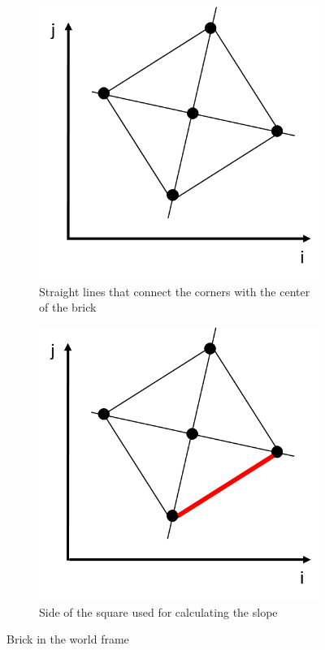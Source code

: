 \begin{figure}[h]
 
\begin{subfigure}{0.5\textwidth}
\captionsetup{justification=centering}
\includegraphics[scale=0.5]{figures/diag_square.png} 
\centering
\caption{Straight lines that connect the corners with the center of the brick}
\label{fig:subim1}
\end{subfigure}
\begin{subfigure}{0.5\textwidth}
\captionsetup{justification=centering}
\includegraphics[scale=0.5]{figures/diag_square_side.png}
\centering
\caption{Side of the square used for calculating the slope}
\label{fig:subim2}
\end{subfigure}
 
\caption{Brick in the world frame}
\label{fig:image2}
\end{figure}

